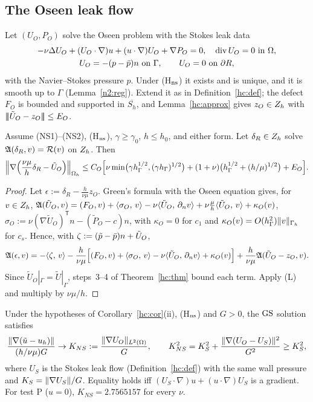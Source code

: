 \subsection{The Oseen leak flow}\label{nb:oseen}

Let $(U_O,P_O)$ solve the Oseen problem with the Stokes leak data
\begin{gather*}
-\nu\Delta U_O+(U_O\cdot\nabla)u+(u\cdot\nabla)U_O+\nabla P_O=0,\quad\operatorname{div} U_O=0\ \text{in }\Omega,\\
U_O=-(p-\bar p)n\ \text{on }\Gamma,\qquad U_O=0\ \text{on }\partial R,
\end{gather*}
with the Navier--Stokes pressure $p$. Under (H$_{\rm ns}$) it exists and is unique, and it is smooth up to $\Gamma$ (Lemma~\ref{n2:reg}). Extend it as in Definition~\ref{hc:def}; the defect $F_O$ is bounded and supported in $\overline{S_h}$, and Lemma~\ref{hc:approx} gives $z_O\in Z_h$ with $|\!|\!|\tilde U_O-z_O|\!|\!|\le E_O$.

\begin{theorem}\label{nb:hc}
Assume (NS1)--(NS2), (H$_{\rm ns}$), $\gamma\ge\gamma_0$, $h\le h_0$, and either form. Let $\delta_R\in Z_h$ solve $\mathfrak A(\delta_R,v)=\mathcal R(v)$ on $Z_h$. Then
\[
\Bigl\|\nabla\Bigl(\frac{\nu\mu}h\delta_R-\tilde U_O\Bigr)\Bigr\|_{\Omega_h}\le C_O\Bigl[\nu\min\bigl(\gamma h_\Gamma^{1/2},(\gamma h_\Gamma)^{1/2}\bigr)+(1+\nu)\bigl(h_\Gamma^{1/2}+(h/\mu)^{1/2}\bigr)+E_O\Bigr].
\]
\end{theorem}

\begin{proof}
Let $\epsilon:=\delta_R-\frac h{\nu\mu}z_O$. Green's formula with the Oseen equation gives, for $v\in Z_h$, $\mathfrak A(\tilde U_O,v)=(F_O,v)+\langle \sigma_O,\, v\rangle-\nu\langle \tilde U_O,\, \partial_n v\rangle+\nu\frac\mu h\langle \tilde U_O,\, v\rangle+\kappa_O(v)$, $\sigma_O:=\nu(\nabla\tilde U_O)^{\mathsf T}n-(\tilde P_O-c)n$, with $\kappa_O=0$ for $c_1$ and $\kappa_O(v)=O(h_\Gamma^2)\lVert v\rVert_{\Gamma_h}$ for $c_s$. Hence, with $\zeta:=(\tilde p-\bar p)n+\tilde U_O$,
\[
\mathfrak A(\epsilon,v)=-\langle \zeta,\, v\rangle-\frac h{\nu\mu}\Bigl[(F_O,v)+\langle \sigma_O,\, v\rangle-\nu\langle \tilde U_O,\, \partial_n v\rangle+\kappa_O(v)\Bigr]+\frac h{\nu\mu}\mathfrak A(\tilde U_O-z_O,v).
\]
Since $\tilde U_O|_\Gamma=\tilde U|_\Gamma$, steps~3--4 of Theorem~\ref{hc:thm} bound each term. Apply (L) and multiply by $\nu\mu/h$.
\end{proof}

\begin{corollary}\label{nb:KNS}
Under the hypotheses of Corollary~\ref{hc:cor}(ii), (H$_{\rm ns}$) and $G>0$, the $\mathrm{GS}$ solution satisfies
\[
\frac{\lVert \nabla(\tilde u-u_h)\rVert}{(h/\nu\mu)G}\to K_{NS}:=\frac{\lVert \nabla U_O\rVert_{L^2(\Omega)}}G,\qquad K_{NS}^2=K_S^2+\frac{\lVert \nabla(U_O-U_S)\rVert^2}{G^2}\ge K_S^2,
\]
where $U_S$ is the Stokes leak flow (Definition~\ref{hc:def}) with the same wall pressure and $K_S=\lVert \nabla U_S\rVert/G$. Equality holds iff $(U_S\cdot\nabla)u+(u\cdot\nabla)U_S$ is a gradient. For test P ($u=0$), $K_{NS}=2.7565157$ for every $\nu$.
\end{corollary}

